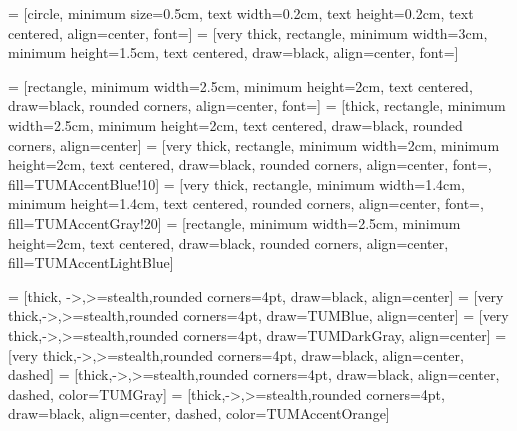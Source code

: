 

\usepackage{pgfplots}
\usepackage{pgfplotstable}
\usepackage{tikz}
\tikzset{>=stealth}
\usetikzlibrary{patterns}
\usetikzlibrary{pgfplots.statistics}
\usetikzlibrary{positioning, shapes}
\usetikzlibrary{calc}



 = [circle, minimum size=0.5cm, text width=0.2cm, text height=0.2cm, text centered, align=center, font=\fontsize{18}{0}\selectfont]
 = [very thick, rectangle, minimum width=3cm, minimum height=1.5cm, text centered, draw=black, align=center, font=\fontsize{18}{0}\selectfont]

 = [rectangle, minimum width=2.5cm, minimum height=2cm, text centered, draw=black, rounded corners, align=center, font=\fontsize{16}{22}\selectfont]
 = [thick, rectangle, minimum width=2.5cm, minimum height=2cm, text centered, draw=black, rounded corners, align=center]
 = [very thick, rectangle, minimum width=2cm, minimum height=2cm, text centered, draw=black, rounded corners, align=center, font=\fontsize{16}{0}\selectfont, fill=TUMAccentBlue!10]
 = [very thick, rectangle, minimum width=1.4cm, minimum height=1.4cm, text centered, rounded corners, align=center, font=\fontsize{16}{0}\selectfont, fill=TUMAccentGray!20]
 = [rectangle, minimum width=2.5cm, minimum height=2cm, text centered, draw=black, rounded corners, align=center, fill=TUMAccentLightBlue]


 = [thick, ->,>=stealth,rounded corners=4pt, draw=black, align=center]
 = [very thick,->,>=stealth,rounded corners=4pt, draw=TUMBlue, align=center]
 = [very thick,->,>=stealth,rounded corners=4pt, draw=TUMDarkGray, align=center]
 = [very thick,->,>=stealth,rounded corners=4pt, draw=black, align=center, dashed]
 = [thick,->,>=stealth,rounded corners=4pt, draw=black, align=center, dashed, color=TUMGray]
 = [thick,->,>=stealth,rounded corners=4pt, draw=black, align=center, dashed, color=TUMAccentOrange]

